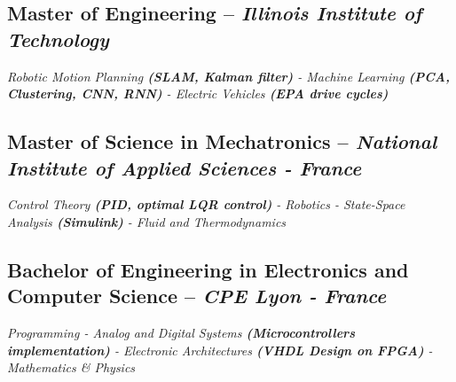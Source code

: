 \documentclass[]{article}
\begin{document}
\normalsize
\subsection{Master of Engineering -- \textit{Illinois Institute of Technology}}

\small{
\textit{Robotic Motion Planning \textbf{(SLAM, Kalman filter)} - Machine Learning \textbf{(PCA, Clustering, CNN, RNN)} - Electric Vehicles \textbf{(EPA drive cycles)} }
}

\vspace{1ex}

\normalsize
\subsection{Master of Science in Mechatronics -- \textit{National Institute of Applied Sciences - France}}

\small{
\textit{Control Theory \textbf{(PID, optimal LQR control)} - Robotics - State-Space Analysis \textbf{(Simulink)} - Fluid and Thermodynamics} 
}%

\vspace{1ex}

\normalsize
\subsection{Bachelor of Engineering in Electronics and Computer Science -- \textit{CPE Lyon - France}}

\small{
\textit{Programming - Analog and Digital Systems \textbf{(Microcontrollers implementation)} - Electronic Architectures \textbf{(VHDL Design on FPGA)} - Mathematics \& Physics}
}
\end{document}
